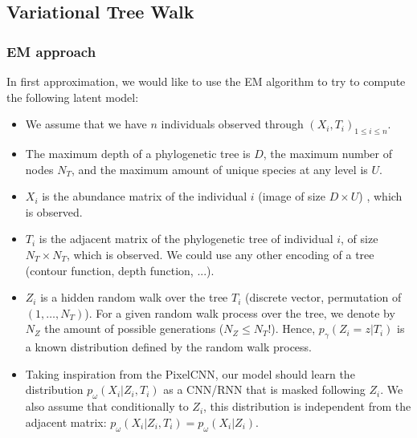 \subsection{Variational Tree Walk}

\subsubsection{EM approach}

In first approximation, we would like to use the EM algorithm to try to compute the following latent model:
\begin{itemize}
    \item We assume that we have $n$ individuals observed through $(X_i, T_i)_{1 \leq i \leq n}$.
    \item The maximum depth of a phylogenetic tree is $D$, the maximum number of nodes $N_T$, and the maximum amount of unique species at any level is $U$.
    \item $X_i$ is the abundance matrix of the individual $i$ (image of size $D \times U$) , which is observed.
    \item $T_i$ is the adjacent matrix of the phylogenetic tree of individual $i$, of size $N_T \times N_T$, which is observed.
          We could use any other encoding of a tree (contour function, depth function, ...).
    \item $Z_i$ is a hidden random walk over the tree $T_i$ (discrete vector, permutation of $(1, \dots, N_T)$).
          For a given random walk process over the tree, we denote by $N_{Z}$ the amount of possible generations ($N_Z \leq N_T!$).
          Hence, $p_{\gamma}(Z_i = z | T_i)$ is a known distribution defined by the random walk process.
    \item Taking inspiration from the PixelCNN, our model should learn the distribution $p_{\omega}(X_i | Z_i, T_i)$ as a CNN/RNN that is masked following $Z_i$.
          We also assume that conditionally to $Z_i$, this distribution is independent from the adjacent matrix: $p_{\omega}(X_i | Z_i, T_i) = p_{\omega}(X_i | Z_i)$.
\end{itemize}

